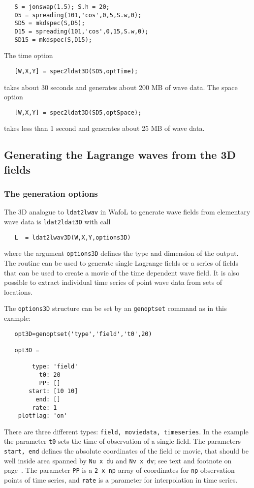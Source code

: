 {\small\begin{verbatim}
   S = jonswap(1.5); S.h = 20;
   D5 = spreading(101,'cos',0,5,S.w,0);
   SD5 = mkdspec(S,D5);
   D15 = spreading(101,'cos',0,15,S.w,0);
   SD15 = mkdspec(S,D15);
\end{verbatim}
}

\noindent
The time option
{\small\begin{verbatim}
   [W,X,Y] = spec2ldat3D(SD5,optTime);
\end{verbatim}
}
\noindent takes about 30 seconds and generates about 200 MB of wave data. The space option
{\small\begin{verbatim}
   [W,X,Y] = spec2ldat3D(SD5,optSpace);
\end{verbatim}
}
\noindent takes less than 1 second and generates about 25 MB of wave data.

\subsection{Generating the Lagrange waves from the 3D fields}
\subsubsection*{The generation options}

The 3D analogue to {\tt ldat2lwav} in {\sc Wafo}L to generate wave fields from
elementary wave data is {\tt ldat2ldat3D} with call
{\small\begin{verbatim}
   L  = ldat2lwav3D(W,X,Y,options3D)
\end{verbatim}
}
\noindent
where the argument {\tt options3D} defines the type and dimension of the output.
The routine can be used to generate single Lagrange fields or a series of fields that
can be used to create a movie of the time dependent wave field. It is also possible
to extract individual time series of point wave data from sets of locations.

The {\tt options3D} structure can be set by an {\tt genoptset} command as in this example:
{\small\begin{verbatim}
   opt3D=genoptset('type','field','t0',20)

   opt3D =

        type: 'field'
          t0: 20
          PP: []
       start: [10 10]
         end: []
        rate: 1
    plotflag: 'on'
\end{verbatim}
}
\noindent
There are three different types: {\tt field, moviedata, timeseries}. In the example the parameter {\tt t0} sets the time of observation of a single field. The parameters {\tt start, end} defines the absolute coordinates of the field or movie, that should be well inside area spanned by {\tt Nu x du} and {\tt Nv x dv}; see text and footnote on page~\pageref{opt}. The parameter {\tt PP} is a {\tt 2 x np} array of coordinates for {\tt np} observation points of time series, and  {\tt rate} is a parameter for interpolation in  time series.


